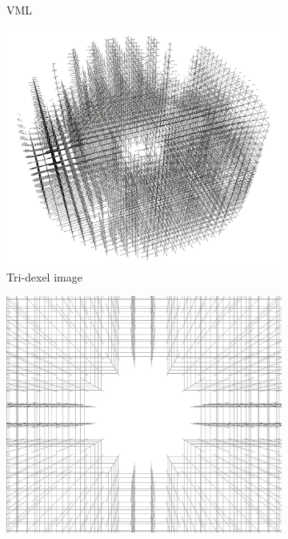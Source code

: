 \begin{figure}
\begin{subfigure}[t]{0.32\textwidth}
		\caption{VML}
		\label{fig:cylinder_head_classified}
	\end{subfigure}
	\begin{subfigure}[t]{0.32\textwidth}
		\centering
		\includegraphics[width=\textwidth]{images/cylinder_head_dexel_image}
		\caption{Tri-dexel image}
		\label{fig:cylinder_head_dexel_image}
	\end{subfigure}
	\begin{subfigure}[t]{0.32\textwidth}
		\centering
		\includegraphics[width=\textwidth]{images/cylinder_head_dexel_image_center}

\end{subfigure}
\end{figure}
